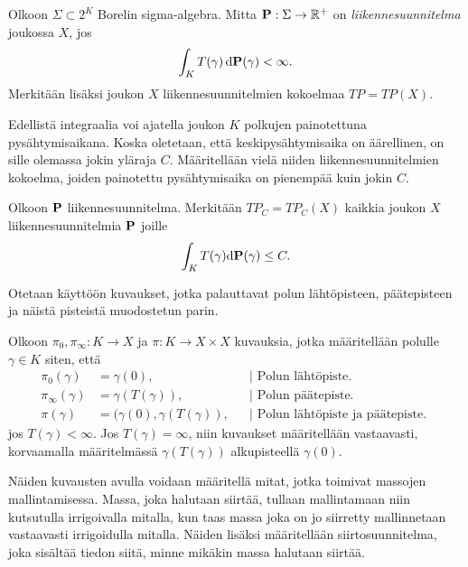 \documentclass[12pt,oneside,a4paper]{amsbook} %
\begin{document}
\begin{definition}\label{def:liikennesuunnitelma}
    Olkoon $\Sigma \subset 2^K$ Borelin sigma-algebra. Mitta $\P: \Sigma \to \R^+$ on \textit{liikennesuunnitelma} joukossa $X$, jos
    \begin{equation*}
     \int_K T(\gamma) \, \d \P (\gamma) < \infty.   
    \end{equation*}
    Merkitään lisäksi joukon $X$ liikennesuunnitelmien kokoelmaa $TP = TP(X)$.
\end{definition}

Edellistä integraalia voi ajatella joukon $K$ polkujen painotettuna pysähtymisaikana. Koska oletetaan, että keskipysähtymisaika on äärellinen, on sille olemassa jokin yläraja $C$. Määritellään vielä niiden liikennesuunnitelmien kokoelma, joiden painotettu pysähtymisaika on pienempää kuin jokin $C$.

\begin{definition}
    Olkoon $\P$ liikennesuunnitelma. Merkitään $TP_C = TP_C(X)$ kaikkia joukon $X$ liikennesuunnitelmia $\P$ joille
    \begin{equation*}
        \int_K T(\gamma) \d \P(\gamma) \le C.
    \end{equation*}
\end{definition}

Otetaan käyttöön kuvaukset, jotka palauttavat polun lähtöpisteen, päätepisteen ja näistä pisteistä muodostetun parin.

\begin{definition}
    Olkoon $\pi_0, \pi_\infty: K\to X$ ja $\pi:K\to X \times X$ kuvauksia, jotka määritellään polulle $\gamma \in K$ siten, että 
    \begin{align*}
        \pi_0(\gamma) &= \gamma(0), &&\Big| \text{ Polun lähtöpiste. }\\
        \pi_\infty(\gamma) &= \gamma(T(\gamma)), &&\Big| \text{ Polun päätepiste. }\\
        \pi(\gamma) &= (\gamma(0), \gamma(T(\gamma)), &&\Big| \text{ Polun lähtöpiste ja päätepiste. }
    \end{align*}
    jos $T(\gamma) < \infty$. Jos $T(\gamma) = \infty$, niin kuvaukset määritellään vastaavasti, korvaamalla määritelmässä $\gamma(T(\gamma))$ alkupisteellä $\gamma(0).$
\end{definition}


Näiden kuvausten avulla voidaan määritellä mitat, jotka toimivat massojen mallintamisessa. Massa, joka halutaan siirtää, tullaan mallintamaan niin kutsutulla irrigoivalla mitalla, kun taas massa joka on jo siirretty mallinnetaan vastaavasti irrigoidulla mitalla. Näiden lisäksi määritellään siirtosuunnitelma, joka sisältää tiedon siitä, minne mikäkin massa halutaan siirtää.
\end{document}
